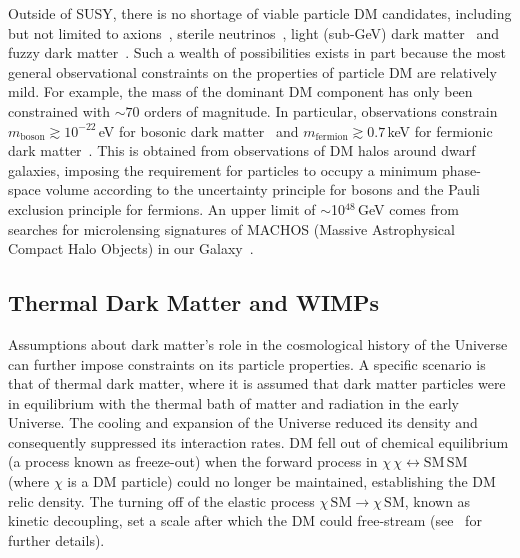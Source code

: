 Outside of SUSY, there is no shortage of viable particle DM candidates, including but not limited to axions~\cite{PhysRevLett.40.223,Peccei:1977hh}, sterile neutrinos~\cite{Abazajian:2001nj,Seljak:2006qw}, light (sub-GeV) dark matter~\cite{Feng:2008ya,Lin:2011gj} and fuzzy dark matter~\cite{Hui:2016ltb}. Such a wealth of possibilities exists in part because the most general observational constraints on the properties of particle DM are relatively mild. For example, the mass of the dominant DM component has only been constrained with $\sim70$ orders of magnitude. 
In particular, observations constrain $m_\text{boson} \gtrsim 10^{-22}$\,eV for bosonic dark matter~\cite{Zhang:2017chj} and $m_\text{fermion} \gtrsim 0.7$\,keV for fermionic dark matter~\cite{Horiuchi:2013noa}. This is obtained from observations of DM halos around dwarf galaxies, imposing the requirement for particles to occupy a minimum phase-space volume according to the uncertainty principle for bosons and the Pauli exclusion principle for fermions. An upper limit of $\sim$10$^{48}$\,GeV comes from searches for microlensing signatures of MACHOS (Massive Astrophysical Compact Halo Objects) in our Galaxy~\cite{Griest:2013aaa}.

\subsection{Thermal Dark Matter and WIMPs}

Assumptions about dark matter's role in the cosmological history of the Universe can further impose constraints on its particle properties. A specific scenario is that of thermal dark matter, where it is assumed that dark matter particles were in equilibrium with the thermal bath of matter and radiation in the early Universe. The cooling and expansion of the Universe reduced its density and consequently suppressed its interaction rates. DM fell out of chemical equilibrium (a process known as freeze-out) when the forward process in $\chi\,\chi\leftrightarrow\mathrm{SM}\,\mathrm{SM}$ (where $\chi$ is a DM particle) could no longer be maintained, establishing the DM relic density. The turning off of the elastic process $\chi\,\mathrm{SM}\rightarrow\chi\,\mathrm{SM}$, known as kinetic decoupling, set a scale after which the DM could free-stream (see~\cite{Bringmann:2006mu} for further details).

